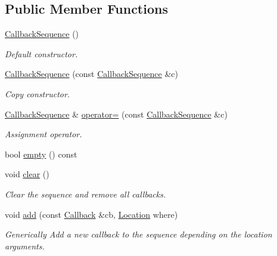 \subsection*{Public Member Functions}
\begin{DoxyCompactItemize}
\item 
\hyperlink{struct_d_d4hep_1_1_callback_sequence_aefd8cccc83fbe0ded44aea01a4da2e77}{CallbackSequence} ()
\begin{DoxyCompactList}\small\item\em Default constructor. \item\end{DoxyCompactList}\item 
\hyperlink{struct_d_d4hep_1_1_callback_sequence_a0ab0fc2e4541f1d9ce38cb3f87c29773}{CallbackSequence} (const \hyperlink{struct_d_d4hep_1_1_callback_sequence}{CallbackSequence} \&c)
\begin{DoxyCompactList}\small\item\em Copy constructor. \item\end{DoxyCompactList}\item 
\hyperlink{struct_d_d4hep_1_1_callback_sequence}{CallbackSequence} \& \hyperlink{struct_d_d4hep_1_1_callback_sequence_ae72a363494db733a31d47f70564f9ae1}{operator=} (const \hyperlink{struct_d_d4hep_1_1_callback_sequence}{CallbackSequence} \&c)
\begin{DoxyCompactList}\small\item\em Assignment operator. \item\end{DoxyCompactList}\item 
bool \hyperlink{struct_d_d4hep_1_1_callback_sequence_a3d00ddfa75fbd3e04d292eac41a8d4ea}{empty} () const 
\item 
void \hyperlink{struct_d_d4hep_1_1_callback_sequence_a3a410a493cc8cd2424b70c9dd2f0a7e9}{clear} ()
\begin{DoxyCompactList}\small\item\em Clear the sequence and remove all callbacks. \item\end{DoxyCompactList}\item 
void \hyperlink{struct_d_d4hep_1_1_callback_sequence_a5941696a51eacc65b1c9221e03e4077d}{add} (const \hyperlink{class_d_d4hep_1_1_callback}{Callback} \&cb, \hyperlink{struct_d_d4hep_1_1_callback_sequence_a7753490247479633aed16a2376821ef7}{Location} where)
\begin{DoxyCompactList}\small\item\em Generically Add a new callback to the sequence depending on the location arguments. \item\end{DoxyCompactList}\item 

\end{DoxyCompactItemize}
